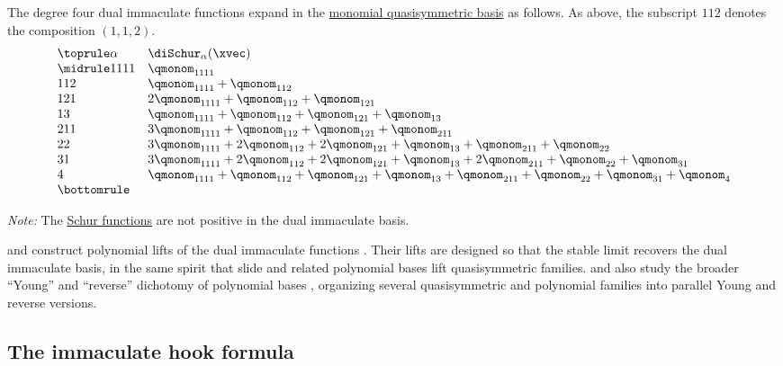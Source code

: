 The degree four dual immaculate functions expand in the
\hyperref[qmonom]{monomial quasisymmetric basis} as follows.  As above,
the subscript $112$ denotes the composition $(1,1,2)$.
\[
\begin{array}{ll}
\toprule
\alpha & \diSchur_\alpha(\xvec) \\
\midrule
1111 & \qmonom_{1111} \\
112  & \qmonom_{1111}+\qmonom_{112} \\
121  & 2\qmonom_{1111}+\qmonom_{112}+\qmonom_{121} \\
13   & \qmonom_{1111}+\qmonom_{112}+\qmonom_{121}+\qmonom_{13} \\
211  & 3\qmonom_{1111}+\qmonom_{112}+\qmonom_{121}+\qmonom_{211} \\
22   & 3\qmonom_{1111}+2\qmonom_{112}+2\qmonom_{121}
       +\qmonom_{13}+\qmonom_{211}+\qmonom_{22} \\
31   & 3\qmonom_{1111}+2\qmonom_{112}+2\qmonom_{121}
       +\qmonom_{13}+2\qmonom_{211}+\qmonom_{22}+\qmonom_{31} \\
4    & \qmonom_{1111}+\qmonom_{112}+\qmonom_{121}+\qmonom_{13}
       +\qmonom_{211}+\qmonom_{22}+\qmonom_{31}+\qmonom_{4} \\
\bottomrule
\end{array}
\]

\emph{Note:} The \hyperref[schurS]{Schur functions} are not positive in the
dual immaculate basis.

 and  construct polynomial lifts of
the dual immaculate functions \cite{MasonSearles2021}.  Their lifts are
designed so that the stable limit recovers the dual immaculate basis, in the
same spirit that slide and related polynomial bases lift quasisymmetric
families.
 and  also study the broader
\enquote{Young} and \enquote{reverse} dichotomy of polynomial bases
\cite{MasonSearles2022}, organizing several quasisymmetric and polynomial
families into parallel Young and reverse versions.


\subsection[dualImmaculateHookFormula]{The immaculate hook formula}


